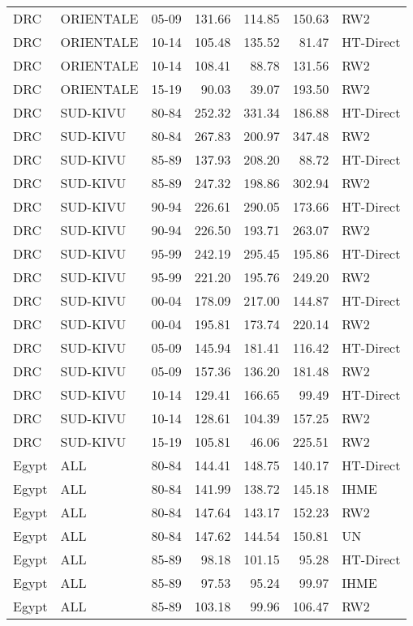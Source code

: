 \begin{longtable}{lllrrrl}
  DRC & ORIENTALE & 05-09 & 131.66 & 114.85 & 150.63 & RW2 \\ 
  DRC & ORIENTALE & 10-14 & 105.48 & 135.52 & 81.47 & HT-Direct \\ 
  DRC & ORIENTALE & 10-14 & 108.41 & 88.78 & 131.56 & RW2 \\ 
  DRC & ORIENTALE & 15-19 & 90.03 & 39.07 & 193.50 & RW2 \\ 
  DRC & SUD-KIVU & 80-84 & 252.32 & 331.34 & 186.88 & HT-Direct \\ 
  DRC & SUD-KIVU & 80-84 & 267.83 & 200.97 & 347.48 & RW2 \\ 
  DRC & SUD-KIVU & 85-89 & 137.93 & 208.20 & 88.72 & HT-Direct \\ 
  DRC & SUD-KIVU & 85-89 & 247.32 & 198.86 & 302.94 & RW2 \\ 
  DRC & SUD-KIVU & 90-94 & 226.61 & 290.05 & 173.66 & HT-Direct \\ 
  DRC & SUD-KIVU & 90-94 & 226.50 & 193.71 & 263.07 & RW2 \\ 
  DRC & SUD-KIVU & 95-99 & 242.19 & 295.45 & 195.86 & HT-Direct \\ 
  DRC & SUD-KIVU & 95-99 & 221.20 & 195.76 & 249.20 & RW2 \\ 
  DRC & SUD-KIVU & 00-04 & 178.09 & 217.00 & 144.87 & HT-Direct \\ 
  DRC & SUD-KIVU & 00-04 & 195.81 & 173.74 & 220.14 & RW2 \\ 
  DRC & SUD-KIVU & 05-09 & 145.94 & 181.41 & 116.42 & HT-Direct \\ 
  DRC & SUD-KIVU & 05-09 & 157.36 & 136.20 & 181.48 & RW2 \\ 
  DRC & SUD-KIVU & 10-14 & 129.41 & 166.65 & 99.49 & HT-Direct \\ 
  DRC & SUD-KIVU & 10-14 & 128.61 & 104.39 & 157.25 & RW2 \\ 
  DRC & SUD-KIVU & 15-19 & 105.81 & 46.06 & 225.51 & RW2 \\ 
  Egypt & ALL & 80-84 & 144.41 & 148.75 & 140.17 & HT-Direct \\ 
  Egypt & ALL & 80-84 & 141.99 & 138.72 & 145.18 & IHME \\ 
  Egypt & ALL & 80-84 & 147.64 & 143.17 & 152.23 & RW2 \\ 
  Egypt & ALL & 80-84 & 147.62 & 144.54 & 150.81 & UN \\ 
  Egypt & ALL & 85-89 & 98.18 & 101.15 & 95.28 & HT-Direct \\ 
  Egypt & ALL & 85-89 & 97.53 & 95.24 & 99.97 & IHME \\ 
  Egypt & ALL & 85-89 & 103.18 & 99.96 & 106.47 & RW2 \\ 

\end{longtable}
